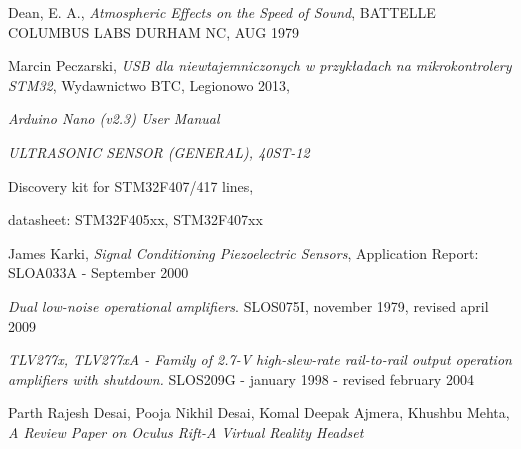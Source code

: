 \begin{thebibliography}{99}



    Dean, E. A., \textit{Atmospheric Effects on the Speed of Sound}, BATTELLE COLUMBUS LABS DURHAM NC, AUG 1979

   Marcin Peczarski, 
  \textit{USB dla niewtajemniczonych w przykładach na mikrokontrolery STM32}, Wydawnictwo BTC, Legionowo 2013,

  \textit{Arduino Nano (v2.3) User Manual}
  
  \textit{ULTRASONIC SENSOR (GENERAL), 40ST-12}
  
   Discovery kit for STM32F407/417 lines,

   datasheet: STM32F405xx, STM32F407xx 
  
   James Karki, \textit{Signal Conditioning Piezoelectric Sensors}, 
  Application Report: SLOA033A - September 2000

   \textit{Dual low-noise operational amplifiers}. SLOS075I, november 1979, revised april 2009

   \textit{TLV277x, TLV277xA - Family of 2.7-V high-slew-rate rail-to-rail output operation amplifiers with shutdown.}
  SLOS209G - january 1998 - revised february 2004

  
    Parth Rajesh Desai, Pooja Nikhil Desai, Komal Deepak Ajmera, Khushbu Mehta,
  \textit{A Review Paper on Oculus Rift-A Virtual Reality Headset}


\end{thebibliography}
